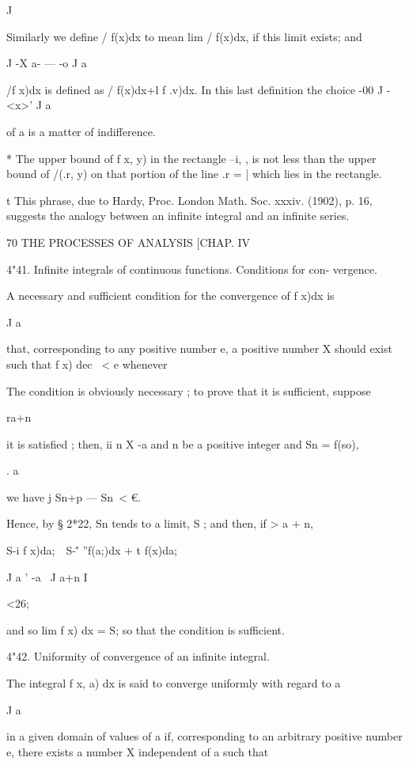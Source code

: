J 

Similarly we define / f(x)dx to mean lim / f(x)dx, if this limit exists; and 

J -X a- — -o J a 

/f x)dx is defined as / f(x)dx+l f .v)dx. In this last definition the choice 
-00 J -<x>' J a 

of a is a matter of indifference. 

* The upper bound of f x, y) in the rectangle --i, ,   is not less than the upper bound 
of /(.r, y) on that portion of the line .r = | which lies in the rectangle. 

t This phrase, due to Hardy, Proc. London Math. Soc. xxxiv. (1902), p. 16, suggests the 
analogy between an infinite integral and an infinite series. 



70 THE PROCESSES OF ANALYSIS [CHAP. IV 

4"41. Infinite integrals of continuous functions. Conditions for con- 
vergence. 

A necessary and sufficient condition for the convergence of f x)dx is 

J a 

that, corresponding to any positive number e, a positive number X should 
exist such that f x) dec \ < e whenever 

The condition is obviously necessary ; to prove that it is sufficient, suppose 

ra+n 

it is satisfied ; then, ii n X -a and n be a positive integer and Sn = f(so), 

. a 

we have j Sn+p — Sn\ <  €. 

Hence, by § 2*22, Sn tends to a limit, S ; and then, if   > a + n, 

S-i f x)da;\ \   S-\'' ''f(a;)dx +  t f(x)da;\ 

J a ' -a \ J a+n I 

<26; 

and so lim f x) dx = S; so that the condition is sufficient. 

4"42. Uniformity of convergence of an infinite integral. 

The integral f x, a) dx is said to converge uniformly with regard to a 

J a 

in a given domain of values of a if, corresponding to an arbitrary positive 
number e, there exists a number X independent of a such that 

